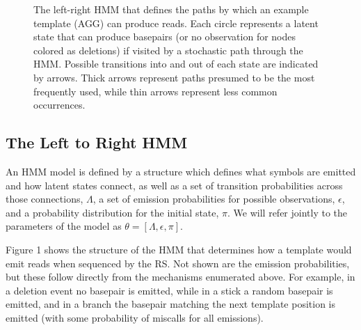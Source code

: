 \documentclass[fleqn,10pt]{SelfArx} %
\begin{document}
\begin{figure}[ht] %
		\caption{The left-right HMM that defines the paths by which an example template (AGG) can produce reads.  Each circle represents a latent state that can produce basepairs (or no observation for nodes colored as deletions) if visited by a stochastic path through the HMM.  Possible transitions into and out of each state are indicated by arrows.  Thick arrows represent paths presumed to be the most frequently used, while thin arrows represent less common occurrences. }				
\end{figure}

\subsection{The Left to Right HMM}
An HMM model is defined by a structure which defines what symbols are emitted and how latent states connect, as well as a set of transition probabilities across those connections, $\Lambda$, a set of emission probabilities for possible observations, $\epsilon$, and a probability distribution for the initial state, $\pi$.   We will refer jointly to the parameters of the model as $\theta = [\Lambda, \epsilon, \pi]$.


Figure 1 shows the structure of the HMM that determines how a template would emit reads when sequenced by the RS.  Not shown are the emission probabilities, but these follow directly from the mechanisms enumerated above.  For example, in a deletion event no basepair is emitted, while in a stick a random basepair is emitted, and in a branch the basepair matching the next template position is emitted (with some probability of miscalls for all emissions).   
\end{document}

